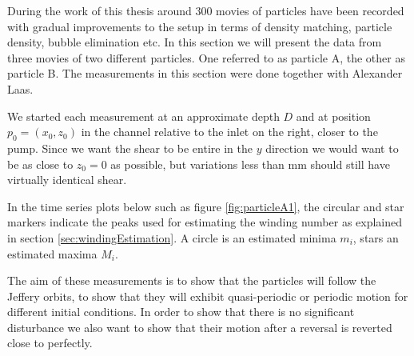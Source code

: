 During the work of this thesis around 300 movies of particles have been recorded with gradual improvements to the setup in terms of density matching, particle density, bubble elimination etc. In this section we will present the data from three movies of two different particles. One referred to as particle A, the other as particle B. The measurements in this section were done together with Alexander Laas.

We started each measurement at an approximate depth $D$ and at position $p_0 = (x_0, z_0)$ in the channel relative to the inlet on the right, closer to the pump. Since we want the shear to be entire in the $y$ direction we would want to be as close to $z_0 = 0$ as possible, but variations less than \unit[1]{mm} should still have virtually identical shear.

In the time series plots below such as figure \ref{fig:particleA1}, the circular and star markers indicate the peaks used for estimating the winding number as explained in section \ref{sec:windingEstimation}. A circle is an estimated minima $m_i$, stars an estimated maxima $M_i$.

The aim of these measurements is to show that the particles will follow the Jeffery orbits, to show that they will exhibit quasi-periodic or periodic motion for different initial conditions. In order to show that there is no significant disturbance we also want to show that their motion after a reversal is reverted close to perfectly.
\newpage